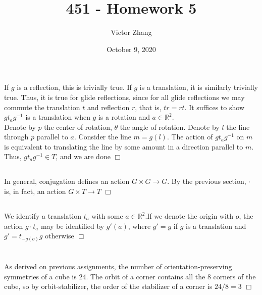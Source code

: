 \documentclass{article}
\title{451 - Homework 5}
\author{Victor Zhang}
\date{October 9, 2020}
\begin{document}
\maketitle

\section{}
\subsection{}
If $g$ is a reflection, this is trivially true. If $g$ is a translation, it is similarly trivially true. Thus, it is true for glide reflections, since for all glide reflections we may commute the translation $t$ and reflection $r$, that is, $tr = rt$. It suffices to show $gt_ag^{-1}$ is a translation when $g$ is a rotation and $a \in \mathbb{R}^2$.\\
Denote by $p$ the center of rotation, $\theta$ the angle of rotation. Denote by $l$ the line through $p$ parallel to $a$. Consider the line $m = g(l)$. The action of $gt_ag^{-1}$ on $m$ is equivalent to translating the line by some amount in a direction parallel to $m$. Thus, $gt_ag^{-1} \in T$, and we are done $\Box$

\subsection{}
In general, conjugation defines an action $G \times G \rightarrow G$. By the previous section, $\cdot$ is, in fact, an action $G \times T \rightarrow T$ $\Box$

\subsection{}
We identify a translation $t_a$ with some $a \in \mathbb{R}^2$.If we denote the origin with $o$, the action $g\cdot t_a$ may be identified by $g'(a)$, where $g' = g$ if $g$ is a translation and $g' = t_{-g(o)}g$ otherwise $\Box$

\section{}
\subsection{}
As derived on previous assignments, the number of orientation-preserving symmetries of a cube is 24. The orbit of a corner contains all the 8 corners of the cube, so by orbit-stabilizer, the order of the stabilizer of a corner is $24/8 = 3$ $\Box$
\end{document}
